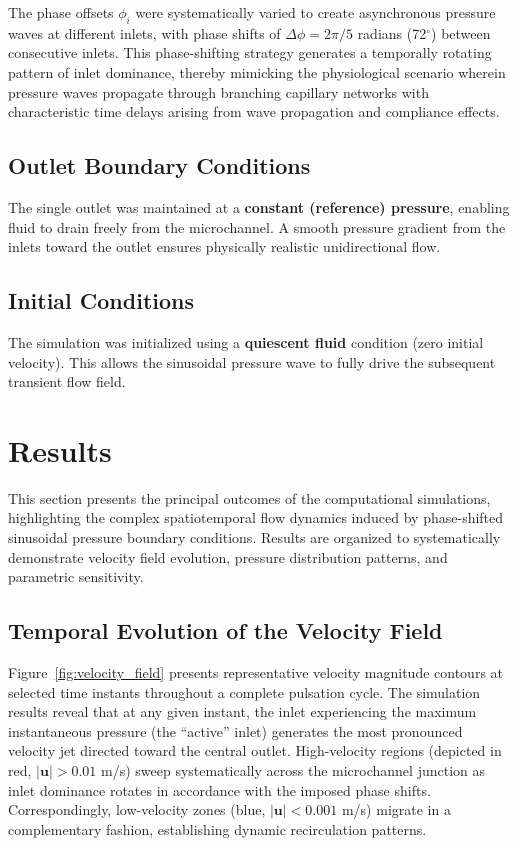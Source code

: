 \documentclass[12pt,a4paper]{article}
\begin{document}
The phase offsets $\phi_i$ were systematically varied to create asynchronous pressure waves at different inlets, with phase shifts of $\Delta\phi = 2\pi/5$ radians (72$^\circ$) between consecutive inlets. This phase-shifting strategy generates a temporally rotating pattern of inlet dominance, thereby mimicking the physiological scenario wherein pressure waves propagate through branching capillary networks with characteristic time delays arising from wave propagation and compliance effects.

\subsection{Outlet Boundary Conditions}

The single outlet was maintained at a \textbf{constant (reference) pressure}, enabling fluid to drain freely from the microchannel. A smooth pressure gradient from the inlets toward the outlet ensures physically realistic unidirectional flow.

\subsection{Initial Conditions}

The simulation was initialized using a \textbf{quiescent fluid} condition (zero initial velocity). This allows the sinusoidal pressure wave to fully drive the subsequent transient flow field.

\section{Results}

This section presents the principal outcomes of the computational simulations, highlighting the complex spatiotemporal flow dynamics induced by phase-shifted sinusoidal pressure boundary conditions. Results are organized to systematically demonstrate velocity field evolution, pressure distribution patterns, and parametric sensitivity.

\subsection{Temporal Evolution of the Velocity Field}

Figure~\ref{fig:velocity_field} presents representative velocity magnitude contours at selected time instants throughout a complete pulsation cycle. The simulation results reveal that at any given instant, the inlet experiencing the maximum instantaneous pressure (the ``active'' inlet) generates the most pronounced velocity jet directed toward the central outlet. High-velocity regions (depicted in red, $|\mathbf{u}| > 0.01$ m/s) sweep systematically across the microchannel junction as inlet dominance rotates in accordance with the imposed phase shifts. Correspondingly, low-velocity zones (blue, $|\mathbf{u}| < 0.001$ m/s) migrate in a complementary fashion, establishing dynamic recirculation patterns.
\end{document}
